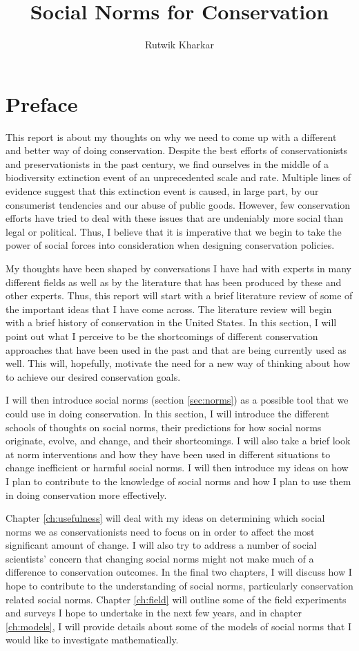 \documentclass{report}
\title{Social Norms for Conservation}
\author{Rutwik Kharkar}
\begin{document}
\maketitle

\section*{Preface}

This report is about my thoughts on why we need to come up with a different and better way of doing conservation. Despite the best efforts of conservationists and preservationists in the past century, we find ourselves in the middle of a biodiversity extinction event of an unprecedented scale and rate. Multiple lines of evidence suggest that this extinction event is caused, in large part, by our consumerist tendencies and our abuse of public goods. However, few conservation efforts have tried to deal with these issues that are undeniably more social than legal or political. Thus, I believe that it is imperative that we begin to take the power of social forces into consideration when designing conservation policies.

My thoughts have been shaped by conversations I have had with experts in many different fields as well as by the literature that has been produced by these and other experts. Thus, this report will start with a brief literature review of some of the important ideas that I have come across. The literature review will begin with a brief history of conservation in the United States. In this section, I will point out what I perceive to be the shortcomings of different conservation approaches that have been used in the past and that are being currently used as well. This will, hopefully, motivate the need for a new way of thinking about how to achieve our desired conservation goals.

I will then introduce social norms (section \ref{sec:norms}) as a possible tool that we could use in doing conservation. In this section, I will introduce the different schools of thoughts on social norms, their predictions for how social norms originate, evolve, and change, and their shortcomings. I will also take a brief look at norm interventions and how they have been used in different situations to change inefficient or harmful social norms. I will then introduce my ideas on how I plan to contribute to the knowledge of social norms and how I plan to use them in doing conservation more effectively. 

Chapter \ref{ch:usefulness} will deal with my ideas on determining which social norms we as conservationists need to focus on in order to affect the most significant amount of change. I will also try to address a number of social scientists' concern that changing social norms might not make much of a difference to conservation outcomes. In the final two chapters, I will discuss how I hope to contribute to the understanding of social norms, particularly conservation related social norms. Chapter \ref{ch:field} will outline some of the field experiments and surveys I hope to undertake in the next few years, and in chapter \ref{ch:models}, I will provide details about some of the models of social norms that I would like to investigate mathematically.
\end{document}
